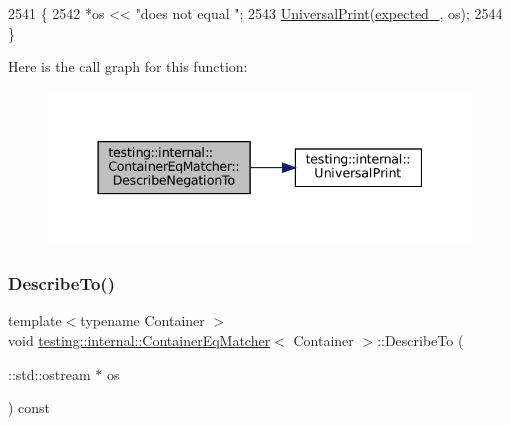 \begin{DoxyCode}
2541                                                 \{
2542     *os << \textcolor{stringliteral}{"does not equal "};
2543     \hyperlink{namespacetesting_1_1internal_a30708fa2bacf11895b03bdb21eb72309}{UniversalPrint}(\hyperlink{classtesting_1_1internal_1_1ContainerEqMatcher_ab5d9ad6869dc59908a4b1c72fde78d31}{expected\_}, os);
2544   \}
\end{DoxyCode}
Here is the call graph for this function\+:
\nopagebreak
\begin{figure}[H]
\begin{center}
\leavevmode
\includegraphics[width=337pt]{classtesting_1_1internal_1_1ContainerEqMatcher_a3dc9e61b6aff65039325138dccccb8ec_cgraph}
\end{center}
\end{figure}
\mbox{\label{classtesting_1_1internal_1_1ContainerEqMatcher_a28ace6da475d05134916eb50e54baf1e}} 
\subsubsection{\texorpdfstring{Describe\+To()}{DescribeTo()}}
{\footnotesize\ttfamily template$<$typename Container $>$ \\
void \hyperlink{classtesting_1_1internal_1_1ContainerEqMatcher}{testing\+::internal\+::\+Container\+Eq\+Matcher}$<$ Container $>$\+::Describe\+To (\begin{DoxyParamCaption}\item[{\+::std\+::ostream $\ast$}]{os }\end{DoxyParamCaption}) const\hspace{0.3cm}{\ttfamily [inline]}}



